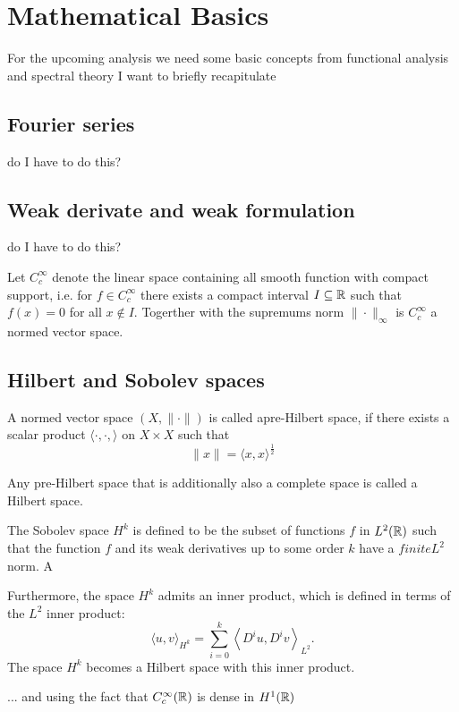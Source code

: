 \section*{Mathematical Basics}

For the upcoming analysis we need some basic concepts from functional analysis and spectral theory I want to briefly recapitulate

\subsection*{Fourier series} do I have to do this?

\subsection*{Weak derivate and weak formulation} do I have to do this?

Let $C_{c}^{\infty}$ denote the linear space containing all smooth function with compact support, i.e. for $f \in C_{c}^{\infty}$ there exists a compact interval $I \subseteq \mathbb{R}$ such that $f(x) = 0$ for all $x \notin I$. Togerther with the supremums norm $\| \cdot \|_{\infty}$ is $C_{c}^{\infty}$ a normed vector space.

\subsection*{Hilbert and Sobolev spaces}
A normed vector space $(X, \| \cdot \|)$ is called apre-Hilbert space, if there exists a scalar product $\langle \cdot, \cdot, \rangle$ on $X \times X$ such that
	\[ \| x \| = \langle x, x \rangle^{\frac{1}{2}} \] 

Any pre-Hilbert space that is additionally also a complete space is called a Hilbert space.

The Sobolev space $H^{k}$ is defined to be the subset of functions $f$ in $L^{2}(\mathbb{R})$ such that the function $f$ and its weak derivatives up to some order $k$ have a $finite L^{2}$ norm. A

Furthermore, the space $H^{k}$ admits an inner product, which is defined in terms of the $L^2$ inner product: 
	\[ \langle u , v \rangle_{H^{k}} = \sum_{i=0}^{k} \left\langle D^{i}u , D^{i} v \right\rangle_{L^{2}}. \] 
The space $H^{k}$ becomes a Hilbert space with this inner product.

... and using the fact that $C_{c}^{\infty}(\mathbb{R})$ is dense in $H^{1}(\mathbb{R})$


